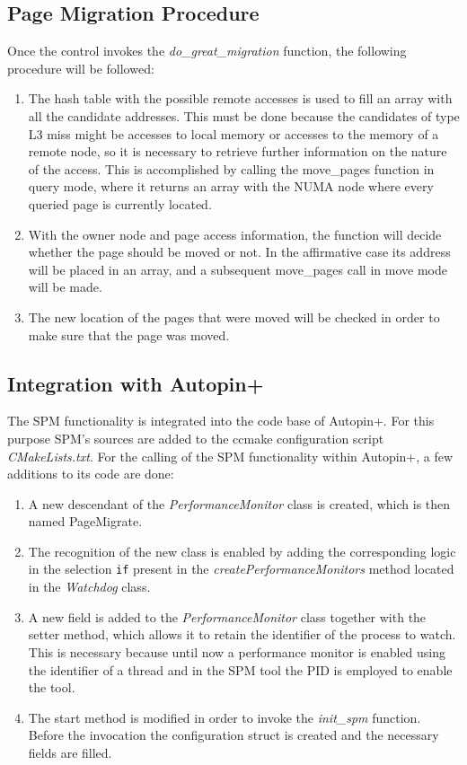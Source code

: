 \subsection{Page Migration Procedure} \label{subsection:pm-proc}

Once the control invokes the \textit{do\_great\_migration} function, the following procedure will be followed:

\begin{enumerate}
	\item The hash table with the possible remote accesses is used to fill an array with all the candidate addresses. This must be done because the candidates of type L3 miss might be accesses to local memory or accesses to the memory of a remote node, so it is necessary to retrieve further information on the nature of the access. This is accomplished by calling the move\_pages function in query mode, where it returns an array with the NUMA node where every queried page is currently located.
	\item With the owner node and page access information, the function will decide whether the page should be moved or not. In the affirmative case its address will be placed in an array, and a subsequent move\_pages call in move mode will be made.
	\item The new location of the pages that were moved will be checked in order to make sure that the page was moved.
\end{enumerate}

\subsection{Integration with Autopin+}\label{subsection:apinplu-intgr}

The SPM functionality is integrated into the code base of Autopin+. For this purpose SPM’s sources are added to the ccmake configuration script \textit{CMakeLists.txt}. For the calling of the SPM functionality within Autopin+, a few additions to its code are done:

\begin{enumerate}
	\item A new descendant of the \textit{PerformanceMonitor} class is created, which is then named PageMigrate.
	\item The recognition of the new class is enabled by adding the corresponding logic in the selection \texttt{if} present in the \textit{createPerformanceMonitors} method located in the \textit{Watchdog} class.
	\item A new field is added to the \textit{PerformanceMonitor} class together with the setter method, which allows it to retain the identifier of the process to watch. This is necessary because until now a performance monitor is enabled using the identifier of a thread and in the SPM tool the PID is employed to enable the tool.
	\item The start method is modified in order to invoke the \textit{init\_spm} function. Before the invocation the configuration struct is created and the necessary fields are filled.
\end{enumerate}
